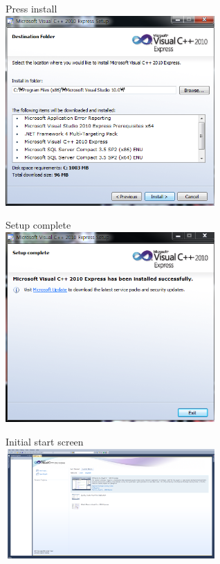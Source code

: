 \documentclass[12pt]{article}
\begin{document}
\begin{center}
Press install\\ [1\baselineskip]
\includegraphics[width=80mm,scale=1.3]{visual4}
\end{center}
\newpage
\begin{center}
Setup complete\\ [1\baselineskip]
\includegraphics[width=80mm,scale=1.3]{visual5}
\end{center}
\begin{center}
Initial start screen\\ [1\baselineskip]
\includegraphics[width=80mm,scale=1.3]{visual6}
\end{center}
\end{document}
